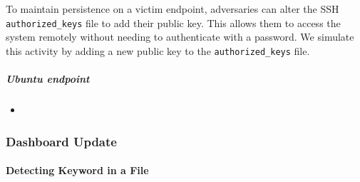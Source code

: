 To maintain persistence on a victim endpoint, adversaries can alter the SSH \texttt{authorized\_keys} file to add their public key. This allows them to access the system remotely without needing to authenticate with a password. We simulate this activity by adding a new public key to the \texttt{authorized\_keys} file.

\subparagraph{Ubuntu endpoint}
\begin{itemize}
    \item
\end{itemize}

\subsubsection{Dashboard Update}
\paragraph{Detecting Keyword in a File}
